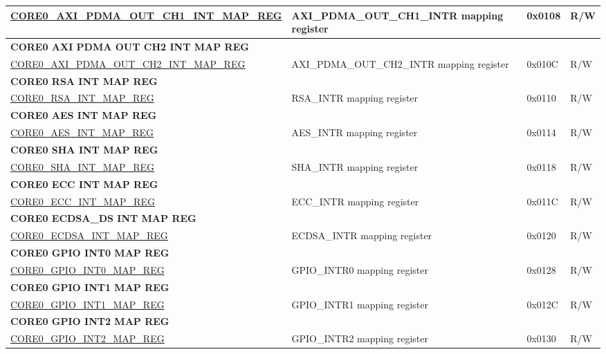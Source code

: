 \begin{longtable}{ | p{7.5cm} | p{7.2cm} | p{1.3cm} | p{1cm} | }
\hyperref[regdesc:CORE0AXIPDMAOUTCH1INTMAPREG]{CORE0\_AXI\_PDMA\_OUT\_CH1\_INT\_MAP\_REG} & AXI\_PDMA\_OUT\_CH1\_INTR mapping register & 0x0108 & R/W \\ \hline
\multicolumn{4}{|l|}{\textbf{CORE0 AXI PDMA OUT CH2 INT MAP REG}} \\ \hline
\hyperref[regdesc:CORE0AXIPDMAOUTCH2INTMAPREG]{CORE0\_AXI\_PDMA\_OUT\_CH2\_INT\_MAP\_REG} & AXI\_PDMA\_OUT\_CH2\_INTR mapping register & 0x010C & R/W \\ \hline
\multicolumn{4}{|l|}{\textbf{CORE0 RSA INT MAP REG}} \\ \hline
\hyperref[regdesc:CORE0RSAINTMAPREG]{CORE0\_RSA\_INT\_MAP\_REG} & RSA\_INTR mapping register & 0x0110 & R/W \\ \hline
\multicolumn{4}{|l|}{\textbf{CORE0 AES INT MAP REG}} \\ \hline
\hyperref[regdesc:CORE0AESINTMAPREG]{CORE0\_AES\_INT\_MAP\_REG} & AES\_INTR mapping register & 0x0114 & R/W \\ \hline
\multicolumn{4}{|l|}{\textbf{CORE0 SHA INT MAP REG}} \\ \hline
\hyperref[regdesc:CORE0SHAINTMAPREG]{CORE0\_SHA\_INT\_MAP\_REG} & SHA\_INTR mapping register & 0x0118 & R/W \\ \hline
\multicolumn{4}{|l|}{\textbf{CORE0 ECC INT MAP REG}} \\ \hline
\hyperref[regdesc:CORE0ECCINTMAPREG]{CORE0\_ECC\_INT\_MAP\_REG} & ECC\_INTR mapping register & 0x011C & R/W \\ \hline
\multicolumn{4}{|l|}{\textbf{CORE0 ECDSA\_DS INT MAP REG}} \\ \hline
\hyperref[regdesc:CORE0ECDSAINTMAPREG]{CORE0\_ECDSA\_INT\_MAP\_REG} & ECDSA\_INTR mapping register & 0x0120 & R/W \\ \hline
\multicolumn{4}{|l|}{\textbf{CORE0 GPIO INT0 MAP REG}} \\ \hline
\hyperref[regdesc:CORE0GPIOINT0MAPREG]{CORE0\_GPIO\_INT0\_MAP\_REG} & GPIO\_INTR0 mapping register & 0x0128 & R/W \\ \hline
\multicolumn{4}{|l|}{\textbf{CORE0 GPIO INT1 MAP REG}} \\ \hline
\hyperref[regdesc:CORE0GPIOINT1MAPREG]{CORE0\_GPIO\_INT1\_MAP\_REG} & GPIO\_INTR1 mapping register & 0x012C & R/W \\ \hline
\multicolumn{4}{|l|}{\textbf{CORE0 GPIO INT2 MAP REG}} \\ \hline
\hyperref[regdesc:CORE0GPIOINT2MAPREG]{CORE0\_GPIO\_INT2\_MAP\_REG} & GPIO\_INTR2 mapping register & 0x0130 & R/W \\ \hline

\end{longtable}
